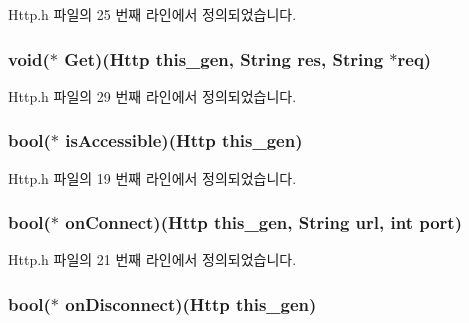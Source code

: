 Http.\-h 파일의 25 번째 라인에서 정의되었습니다.

\hypertarget{struct___http_a7d476aeddf2c20ee482845959c71446b}{
\subsubsection[{Get}]{\setlength{\rightskip}{0pt plus 5cm}void($\ast$  Get)({\bf Http} this\-\_\-gen, {\bf String} res, {\bf String} $\ast$req)}}\label{struct___http_a7d476aeddf2c20ee482845959c71446b}


Http.\-h 파일의 29 번째 라인에서 정의되었습니다.

\hypertarget{struct___http_a3f21ba58588b0d2e11e7611caf3fa65c}{
\subsubsection[{is\-Accessible}]{\setlength{\rightskip}{0pt plus 5cm}bool($\ast$  is\-Accessible)({\bf Http} this\-\_\-gen)}}\label{struct___http_a3f21ba58588b0d2e11e7611caf3fa65c}


Http.\-h 파일의 19 번째 라인에서 정의되었습니다.

\hypertarget{struct___http_a952cc07a3505431bf33a7a6393a1503a}{
\subsubsection[{on\-Connect}]{\setlength{\rightskip}{0pt plus 5cm}bool($\ast$  on\-Connect)({\bf Http} this\-\_\-gen, {\bf String} url, int port)}}\label{struct___http_a952cc07a3505431bf33a7a6393a1503a}


Http.\-h 파일의 21 번째 라인에서 정의되었습니다.

\hypertarget{struct___http_ad6d1f6047ef195fe434e3d259aa0375a}{
\subsubsection[{on\-Disconnect}]{\setlength{\rightskip}{0pt plus 5cm}bool($\ast$  on\-Disconnect)({\bf Http} this\-\_\-gen)}}\label{struct___http_ad6d1f6047ef195fe434e3d259aa0375a}


